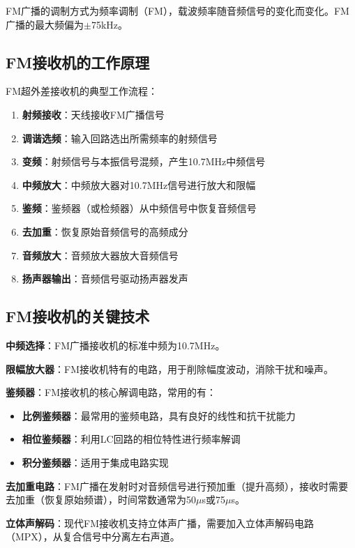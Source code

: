 FM广播的调制方式为频率调制（FM），载波频率随音频信号的变化而变化。FM广播的最大频偏为$\pm$75kHz。

\subsection{FM接收机的工作原理}
\label{sec:fm_receiver_principle}

FM超外差接收机的典型工作流程：

\begin{enumerate}
    \item \textbf{射频接收}：天线接收FM广播信号
    \item \textbf{调谐选频}：输入回路选出所需频率的射频信号
    \item \textbf{变频}：射频信号与本振信号混频，产生10.7MHz中频信号
    \item \textbf{中频放大}：中频放大器对10.7MHz信号进行放大和限幅
    \item \textbf{鉴频}：鉴频器（或检频器）从中频信号中恢复音频信号
    \item \textbf{去加重}：恢复原始音频信号的高频成分
    \item \textbf{音频放大}：音频放大器放大音频信号
    \item \textbf{扬声器输出}：音频信号驱动扬声器发声
\end{enumerate}

\subsection{FM接收机的关键技术}
\label{sec:fm_receiver_tech}

\textbf{中频选择}：FM广播接收机的标准中频为10.7MHz。

\textbf{限幅放大器}：FM接收机特有的电路，用于削除幅度波动，消除干扰和噪声。

\textbf{鉴频器}：FM接收机的核心解调电路，常用的有：
\begin{itemize}
    \item \textbf{比例鉴频器}：最常用的鉴频电路，具有良好的线性和抗干扰能力
    \item \textbf{相位鉴频器}：利用LC回路的相位特性进行频率解调
    \item \textbf{积分鉴频器}：适用于集成电路实现
\end{itemize}

\textbf{去加重电路}：FM广播在发射时对音频信号进行预加重（提升高频），接收时需要去加重（恢复原始频谱），时间常数通常为50$\mu$s或75$\mu$s。

\textbf{立体声解码}：现代FM接收机支持立体声广播，需要加入立体声解码电路（MPX），从复合信号中分离左右声道。

